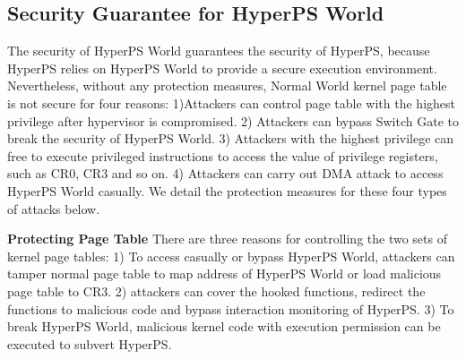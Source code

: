 \documentclass[conference]{IEEEtran}
\begin{document}
\subsection{Security Guarantee for HyperPS World}\label {SG}
The security of HyperPS World guarantees the security of HyperPS, because HyperPS relies on HyperPS World to provide a secure execution environment.
Nevertheless, without any protection measures, Normal World kernel page table is not secure for four reasons: 1)Attackers can control page table with the highest privilege after hypervisor is compromised. 2) Attackers can bypass Switch Gate to break the security of HyperPS World. 3) Attackers with the highest privilege can free to execute privileged instructions to access the value of privilege registers, such as CR0, CR3 and so on. 4) Attackers can carry out DMA attack to access HyperPS World casually.
We detail the protection measures for these four types of attacks below.



\textbf{Protecting Page Table}
There are three reasons for controlling the two sets of kernel page tables: 1) To access casually or bypass HyperPS World, attackers can tamper normal page table to map address of HyperPS World or load malicious page table to CR3.
2) attackers can cover the hooked functions, redirect the functions to malicious code and bypass interaction monitoring of HyperPS. 3) To break HyperPS World, malicious kernel code with execution permission can be executed to subvert HyperPS.
\end{document}
